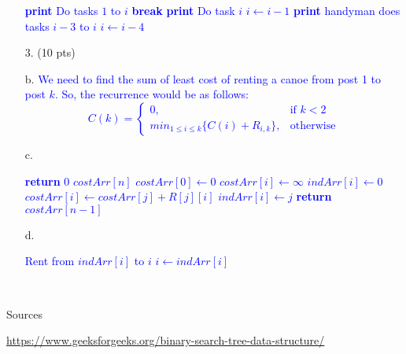 \documentclass[11pt]{article}
\begin{document}
\begin{itemize}
	\textcolor{blue}{
\begin{algorithmic}[1]
			\State \textbf{print} Do tasks $1$ to $i$
			\State \textbf{break}
			\State \textbf{print} Do task $i$
			\State $i \gets i - 1$
		\Else	
			\State \textbf{print} handyman does tasks $i - 3$ to $i$
			\State $i \gets i - 4$
		\EndIf
	\EndFor
\EndFunction
\end{algorithmic}
}
	
	
\item[$3.$] (10 pts)

	\item[b.]
	\textcolor{blue}{
	We need to find the sum of least cost of renting a canoe from post 1 to post $k$. So, the recurrence would be as follows:
	$$\boxed{{\displaystyle C(k)={
\begin{cases}{0},&{\text{if }} k < 2\\ min_{1 \leq i \leq k}\{ C(i) + R_{i,k} \},&{\text{otherwise}}
\end{cases}}}}$$
	}
	\item[c.]
	\textcolor{blue}{
	\begin{algorithmic}[1]
 
		\State \textbf{return}  0
	\EndIf
	\State $costArr[n]$
	\State $costArr[0] \gets 0$
		\State $costArr[i] \gets \infty$ 
		\State $indArr[i] \gets 0$
				\State $costArr[i] \gets costArr[j] + R[j][i]$
				\State $indArr[i] \gets j$
			\EndIf
		\EndFor
	\EndFor
	\State \textbf{return} $costArr[n-1]$
\EndFunction
\end{algorithmic}
	}
	\item[d.]
	\textcolor{blue}{
	\begin{algorithmic}[1]
		\State Rent from $indArr[i]$ to $i$ 
		\State $i \gets indArr[i]$
	\EndFor
\EndFunction
\end{algorithmic}
	}\
	
\end{itemize}
\begin{center}
Sources
\end{center}

\url{https://www.geeksforgeeks.org/binary-search-tree-data-structure/}
\end{document}
